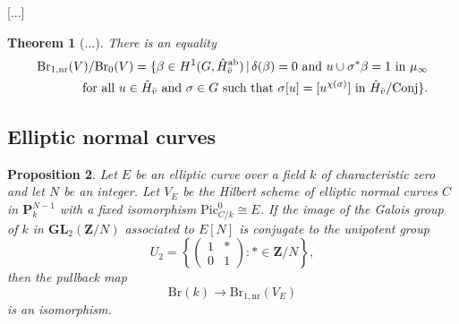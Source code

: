 \documentclass[10pt,letterpaper,twoside]{article}
\renewcommand{\1}{\mathbf{1}}
\newcommand{\bP}{\mathbf{P}}
\newcommand{\bZ}{\mathbf{Z}}
\newcommand{\nr}{\mathrm{nr}}
\newcommand{\GL}{\mathbf{GL}}
\newcommand{\Pic}{\mathrm{Pic}}
\newcommand{\Br}{\mathrm{Br}}
\newcommand{\iso}{\cong}
\theoremstyle{plain}
\newtheorem{theorem}{Theorem}[section]
\newtheorem{proposition}[theorem]{Proposition}
\theoremstyle{plain}
\theoremstyle{definition}
\theoremstyle{named}
\theoremstyle{definition}
\begin{document}
[...]


\begin{theorem}[...]
    There is an equality
\begin{align*}
    \Br_{1,\nr}(V)/\Br_0(V) = \{\beta \in H^1(G, \hat{H}^{\mathrm{ab}}_{\Bar{v}}) \,|\, \delta(\beta) = 0 \text{ and } u \cup \sigma^*\beta = 1 \text{ in $\mu_\infty$}\\
    \text{for all $u \in \hat{H}_{\Bar{v}}$ and $\sigma \in G$ such that $\sigma[u] = [u^{\chi(\sigma)}]$ in $\hat{H}_{\Bar{v}}/\text{Conj}$}\}.
\end{align*}
\end{theorem}




\subsection{Elliptic normal curves}



\begin{proposition}
    Let $E$ be an elliptic curve over a field $k$ of characteristic zero and let $N$ be an integer. Let $V_E$ be the
    Hilbert scheme of elliptic normal curves $C$ in $\bP^{N-1}_k$
    with a fixed isomorphism $\Pic_{C/k}^0\iso E$. 
    If the image of the Galois group of $k$ in $\GL_2(\bZ/N)$ associated to $E[N]$
    is conjugate to the unipotent group $$U_2=\left\{\begin{pmatrix}1&*\\0&1\end{pmatrix}\colon
    *\in\bZ/N\right\},$$ then the pullback map $$\Br(k)\rightarrow\Br_{1,\nr}(V_E)$$
    is an isomorphism.
\end{proposition}
\end{document}
